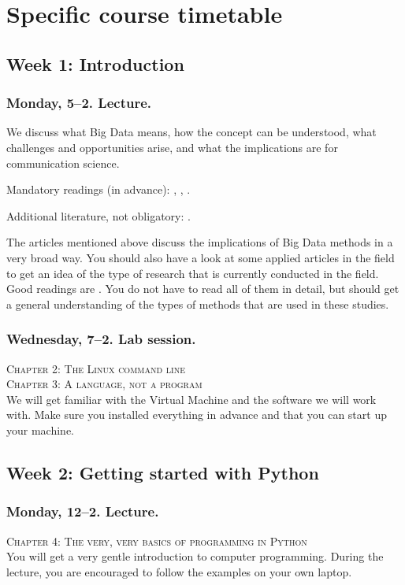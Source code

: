 \documentclass[a4paper,12pt]{report}
\begin{document}
\chapter{Specific course timetable}


\section*{Week 1: Introduction}
\subsection*{Monday, 5--2. Lecture.}
We discuss what Big Data means, how the concept can be understood, what challenges and opportunities arise, and what the implications are for communication science. 

Mandatory readings (in advance): \citealp{boyd2012}, \citealp{Vis2013}, \citealp{Kitchin2014}. 

Additional literature, not obligatory: \citealp{Mahrt2013}.

The articles mentioned above discuss the implications of Big Data methods in a very broad way. You should also have a look at some applied articles in the field to get an idea of the type of research that is currently conducted in the field. Good readings are \citealp{Castillo2014,Ellison2013,Conover2012}. You do not have to read all of them in detail, but should get a general understanding of the types of methods that are used in these studies.


\subsection*{Wednesday, 7--2. Lab session.}
\textsc{ Chapter 2: The Linux command line}\\
\textsc{ Chapter 3: A language, not a program}\\

We will get familiar with the Virtual Machine and the software we will work with. Make sure you installed everything in advance and that you can start up your machine. 





\section*{Week 2: Getting started with Python}

\subsection*{Monday, 12--2. Lecture.}
\textsc{ Chapter 4: The very, very basics of programming in Python}\\
You will get a very gentle introduction to computer programming. During the lecture, you are encouraged to follow the examples on your own laptop.
\end{document}
